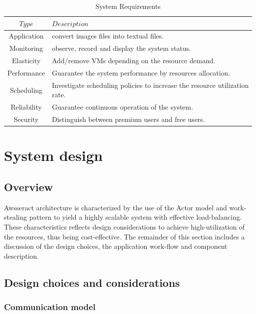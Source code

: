 \documentclass[conference]{IEEEtran}
\begin{document}
\begin{table}
\renewcommand{\arraystretch}{1.3}
\caption{System Requirements}\label{tab:sysreq}
\centering
\begin{tabular*}{8cm}{c|p{5cm}}
    \hline
    $Type$&$Description$\\
    \hline
    Application&convert images files into textual files.\\
    Monitoring&observe, record and display the system status.\\
    Elasticity&Add/remove VMs depending on the resource demand.\\
    Performance&Guarantee the system performance by resources allocation.\\
    Scheduling&Investigate scheduling policies to increase the resource utilization rate.\\
    Reliability&Guarantee continuous operation of the system.\\
    Security&Distinguish between premium users and free users.\\
    \hline
\end{tabular*}
\end{table}
\section{System design}\label{sec:sysdesign}

\subsection{Overview}
\noindent
Awsseract architecture is characterized by the use of the Actor model and work-stealing pattern to yield a highly scalable system with effective load-balancing. These characteristics reflects design considerations to achieve high-utilization of the resources, thus being cost-effective. The remainder of this section includes a discussion of the design choices, the application work-flow and component description.   



\subsection{Design choices and considerations}\label{sec:sysdesign_choices}

\subsubsection{Communication model}\label{sec:sysdesign_com}
\end{document}
